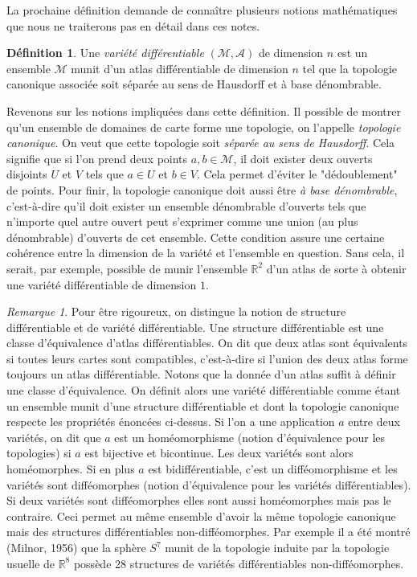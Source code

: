 \documentclass[a4paper,11pt]{report}
\theoremstyle{definition}
\theoremstyle{plain}
\theoremstyle{definition}
\newtheorem{defn}{Définition}[chapter]
\theoremstyle{remark}
\newtheorem{rmk}{Remarque}[chapter]
\newcommand{\M}{\mathscr{M}}
\newcommand{\A}{\mathcal{A}}
\begin{document}
            La prochaine définition demande de connaître plusieurs notions mathématiques que nous ne traiterons pas en détail dans ces notes.
            
            \begin{defn}
                Une \textit{variété différentiable} $(\M,\A)$ de dimension $n$ est un ensemble $\M$ munit d'un atlas différentiable de dimension $n$ tel que la topologie canonique associée soit séparée au sens de Hausdorff et à base dénombrable.
            \end{defn}
            
            Revenons sur les notions impliquées dans cette définition. Il possible de montrer qu'un ensemble de domaines de carte forme une topologie, on l'appelle \textit{topologie canonique}. On veut que cette topologie soit \textit{séparée au sens de Hausdorff}. Cela signifie que si l'on prend deux points $a, b \in \M$, il doit exister deux ouverts disjoints $U$ et $V$ tels que $a \in U$ et $b \in V$. Cela permet d'éviter le "dédoublement" de points. Pour finir, la topologie canonique doit aussi être \textit{à base dénombrable}, c'est-à-dire qu'il doit exister un ensemble dénombrable d'ouverts tels que n'importe quel autre ouvert peut s'exprimer comme une union (au plus dénombrable) d'ouverts de cet ensemble. Cette condition assure une certaine cohérence entre la dimension de la variété et l'ensemble en question. Sans cela, il serait, par exemple, possible de munir l'ensemble $\mathbb{R}^2$ d'un atlas de sorte à obtenir une variété différentiable de dimension $1$.
            
            \begin{rmk}
                Pour être rigoureux, on distingue la notion de structure différentiable et de variété différentiable. Une structure différentiable est une classe d'équivalence d'atlas différentiables. On dit que deux atlas sont équivalents si toutes leurs cartes sont compatibles, c'est-à-dire si l'union des deux atlas forme toujours un atlas différentiable. Notons que la donnée d'un atlas suffit à définir une classe d'équivalence. On définit alors une variété différentiable comme étant un ensemble munit d'une structure différentiable et dont la topologie canonique respecte les propriétés énoncées ci-dessus. Si l'on a une application $a$ entre deux variétés, on dit que $a$ est un homéomorphisme (notion d'équivalence pour les topologies) si $a$ est bijective et bicontinue. Les deux variétés sont alors homéomorphes. Si en plus $a$ est bidifférentiable, c'est un difféomorphisme et les variétés sont difféomorphes (notion d'équivalence pour les variétés différentiables). Si deux variétés sont difféomorphes elles sont aussi homéomorphes mais pas le contraire. Ceci permet au même ensemble d'avoir la même topologie canonique mais des structures différentiables non-difféomorphes. Par exemple il a été montré (Milnor, 1956) que la sphère $S^7$ munit de la topologie induite par la topologie usuelle de $\mathbb{R}^8$ possède 28 structures de variétés différentiables non-difféomorphes.
            \end{rmk}
            
\end{document}
